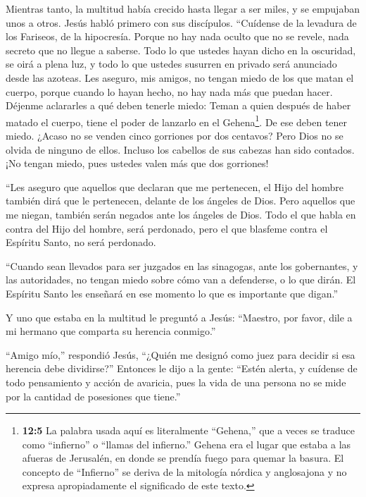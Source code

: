  Mientras tanto, la multitud había crecido hasta llegar a
ser miles, y se empujaban unos a otros. Jesús habló primero con sus
discípulos. ``Cuídense de la levadura de los Fariseos, de la hipocresía.
 Porque no hay nada oculto que no se revele, nada secreto
que no llegue a saberse.  Todo lo que ustedes hayan dicho en
la oscuridad, se oirá a plena luz, y todo lo que ustedes susurren en
privado será anunciado desde las azoteas.  Les aseguro, mis
amigos, no tengan miedo de los que matan el cuerpo, porque cuando lo
hayan hecho, no hay nada más que puedan hacer.  Déjenme
aclararles a qué deben tenerle miedo: Teman a quien después de haber
matado el cuerpo, tiene el poder de lanzarlo en el Gehena\footnote{\textbf{12:5}
  La palabra usada aquí es literalmente ``Gehena,'' que a veces se
  traduce como ``infierno'' o ``llamas del infierno.'' Gehena era el
  lugar que estaba a las afueras de Jerusalén, en donde se prendía fuego
  para quemar la basura. El concepto de ``Infierno'' se deriva de la
  mitología nórdica y anglosajona y no expresa apropiadamente el
  significado de este texto.}. De ese deben tener miedo. 
¿Acaso no se venden cinco gorriones por dos centavos? Pero Dios no se
olvida de ninguno de ellos.  Incluso los cabellos de sus
cabezas han sido contados. ¡No tengan miedo, pues ustedes valen más que
dos gorriones!

 ``Les aseguro que aquellos que declaran que me pertenecen,
el Hijo del hombre también dirá que le pertenecen, delante de los
ángeles de Dios.  Pero aquellos que me niegan, también serán
negados ante los ángeles de Dios.  Todo el que habla en
contra del Hijo del hombre, será perdonado, pero el que blasfeme contra
el Espíritu Santo, no será perdonado.

 ``Cuando sean llevados para ser juzgados en las sinagogas,
ante los gobernantes, y las autoridades, no tengan miedo sobre cómo van
a defenderse, o lo que dirán.  El Espíritu Santo les
enseñará en ese momento lo que es importante que digan.''

 Y uno que estaba en la multitud le preguntó a Jesús:
``Maestro, por favor, dile a mi hermano que comparta su herencia
conmigo.''

 ``Amigo mío,'' respondió Jesús, ``¿Quién me designó como
juez para decidir si esa herencia debe dividirse?'' Entonces le dijo a
la gente:  ``Estén alerta, y cuídense de todo pensamiento y
acción de avaricia, pues la vida de una persona no se mide por la
cantidad de posesiones que tiene.''


